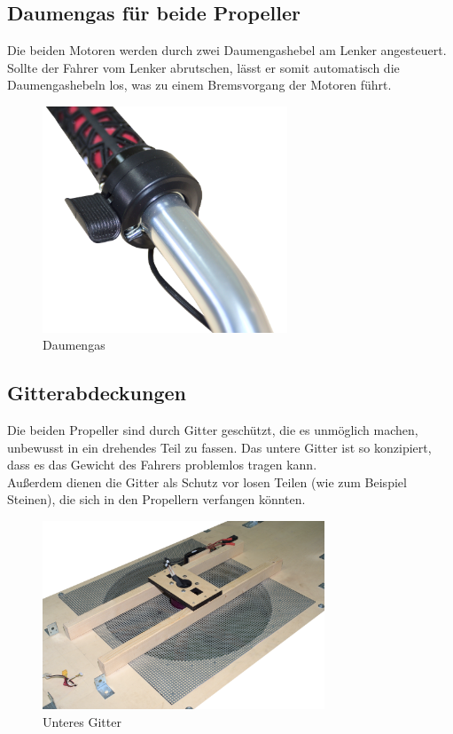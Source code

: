 \subsection{Daumengas für beide Propeller}
Die beiden Motoren werden durch zwei Daumengashebel am Lenker angesteuert. Sollte der Fahrer vom Lenker abrutschen, lässt er somit automatisch die Daumengashebeln los, was zu einem Bremsvorgang der Motoren führt.
\begin{figure}[h]
    \centering
    \includegraphics[width=0.65\textwidth]{Fotos/Daumengas.png}
    \caption{Daumengas}    
\end{figure}

\newpage
\subsection{Gitterabdeckungen}
Die beiden Propeller sind durch Gitter geschützt, die es unmöglich machen, unbewusst in ein drehendes Teil zu fassen. Das untere Gitter ist so konzipiert, dass es das Gewicht des Fahrers problemlos tragen kann.\\
Außerdem dienen die Gitter als Schutz vor losen Teilen (wie zum Beispiel Steinen), die sich in den Propellern verfangen könnten.
\begin{figure}[H]
    \centering
    \includegraphics[width=0.75\textwidth]{Fotos/Konstruktion/DSC_8718_gitter_unten.png}
    \caption{Unteres Gitter}    
\end{figure}

